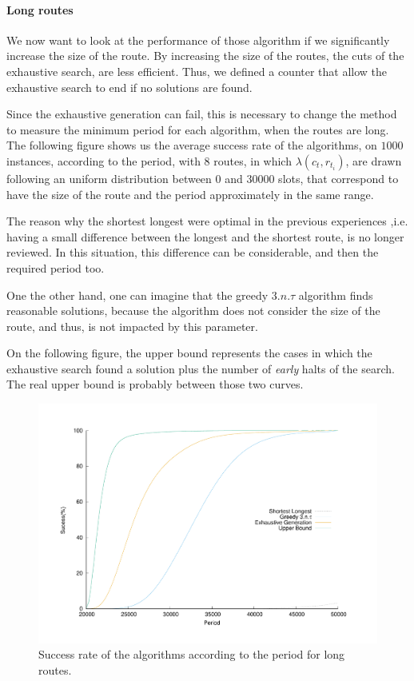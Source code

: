 \documentclass[a4paper,10pt]{article}
\begin{document}
      \paragraph{Long routes}
      We now want to look at the performance of those algorithm if we significantly increase the size of the route. By increasing the size of the routes, the cuts of the exhaustive search, are less efficient. Thus, we defined a counter that allow the exhaustive search to end if no solutions are found.
      
      Since the exhaustive generation can fail, this is necessary to change the method to measure the minimum period for each algorithm, when the routes are long.      
      The following figure shows us the average success rate of the algorithms, on $1000$ instances, according to the period, with 8 routes, in which $\lambda(c_t,r_{t_i})$, are drawn following an uniform distribution between $0$ and $30000$ slots, that correspond to have the size of the route and the period approximately in the same range.
      
      The reason why the shortest longest were optimal in the previous experiences ,i.e. having a small difference between the longest and the shortest route, is no longer reviewed. In this situation, this difference can be considerable, and then the required period too.
      
      One the other hand, one can imagine that the greedy $3.n.\tau$ algorithm finds reasonable solutions, because the algorithm does not consider the size of the route, and thus, is not impacted by this parameter.
      
      On the following figure, the upper bound represents the cases in which the exhaustive search found a solution plus the number of {\em early} halts of the search. The real upper bound is probably between those two curves.
\begin{figure}

       \begin{center}
      \includegraphics[scale=0.4]{echec_longues.pdf}
      \end{center}
      \caption{Success rate of the algorithms according to the period for long routes.}
     \end{figure}
      
\end{document}
